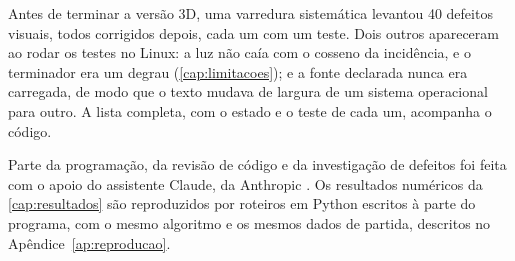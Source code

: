 Antes de terminar a versão 3D, uma varredura sistemática levantou 40 defeitos visuais, todos corrigidos depois, cada um com um teste. Dois outros apareceram ao rodar os testes no Linux: a luz não caía com o cosseno da incidência, e o terminador era um degrau (\autoref{cap:limitacoes}); e a fonte declarada nunca era carregada, de modo que o texto mudava de largura de um sistema operacional para outro. A lista completa, com o estado e o teste de cada um, acompanha o código.

Parte da programação, da revisão de código e da investigação de defeitos foi feita com o apoio do assistente Claude, da Anthropic \cite{anthropic2026}. Os resultados numéricos da \autoref{cap:resultados} são reproduzidos por roteiros em Python escritos à parte do programa, com o mesmo algoritmo e os mesmos dados de partida, descritos no Apêndice~\ref{ap:reproducao}.
